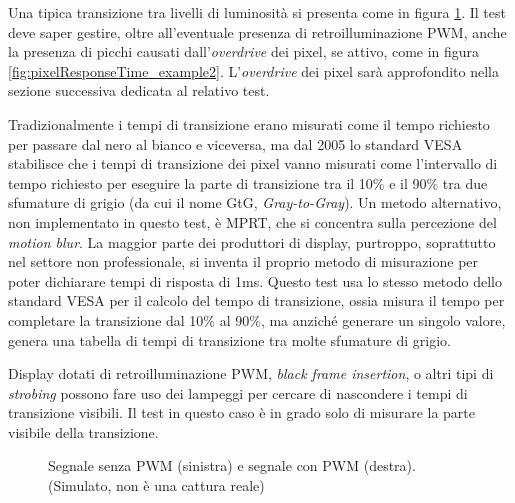 Una tipica transizione tra livelli di luminosità si presenta come in figura \ref{fig:pixelResponseTime_example1}. Il test deve saper gestire, oltre all'eventuale presenza di retroilluminazione PWM, anche la presenza di picchi causati dall'\textit{overdrive} dei pixel, se attivo, come in figura \ref{fig:pixelResponseTime_example2}. L'\textit{overdrive} dei pixel sarà approfondito nella sezione successiva dedicata al relativo test.

Tradizionalmente i tempi di transizione erano misurati come il tempo richiesto per passare dal nero al bianco e viceversa, ma dal 2005 lo standard VESA\cite{vesa_measurementstd} stabilisce che i tempi di transizione dei pixel vanno misurati come l'intervallo di tempo richiesto per eseguire la parte di transizione tra il 10\% e il 90\% tra due sfumature di grigio (da cui il nome GtG, \textit{Gray-to-Gray}). Un metodo alternativo, non implementato in questo test, è MPRT\cite{mprt}, che si concentra sulla percezione del \textit{motion blur}. La maggior parte dei produttori di display, purtroppo, soprattutto nel settore non professionale, si inventa il proprio metodo di misurazione per poter dichiarare tempi di risposta di 1ms. Questo test usa lo stesso metodo dello standard VESA per il calcolo del tempo di transizione, ossia misura il tempo per completare la transizione dal 10\% al 90\%, ma anziché generare un singolo valore, genera una tabella di tempi di transizione tra molte sfumature di grigio.

Display dotati di retroilluminazione PWM, \textit{black frame insertion}, o altri tipi di \textit{strobing} possono fare uso dei lampeggi per cercare di nascondere i tempi di transizione visibili. Il test in questo caso è in grado solo di misurare la parte visibile della transizione.

\begin{figure}[H]
	\centering
	\caption{Segnale senza PWM (sinistra) e segnale con PWM (destra). (Simulato, non è una cattura reale)}
	\label{fig:pixelResponseTime_example1}
\end{figure}

